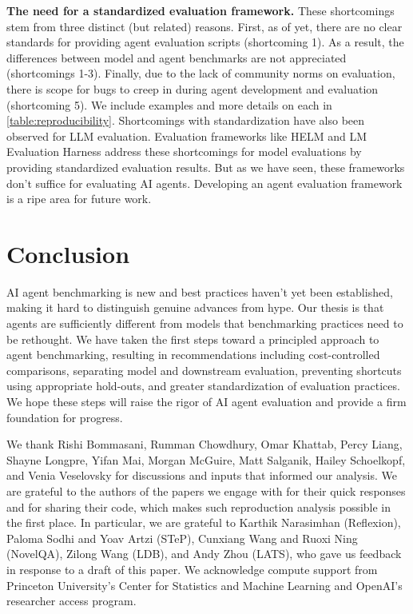 \documentclass{article}
\begin{document}
\textbf{The need for a standardized evaluation framework.} These shortcomings stem from three distinct (but related) reasons. First, as of yet, there are no clear standards for providing agent evaluation scripts (shortcoming 1). As a result, the differences between model and agent benchmarks are not appreciated (shortcomings 1-3). Finally, due to the lack of community norms on evaluation, there is scope for bugs to creep in during agent development and evaluation (shortcoming 5). We include examples and more details on each in \cref{table:reproducibility}.
Shortcomings with standardization have also been observed for LLM evaluation. Evaluation frameworks like HELM \citep{liang_holistic_2023} and LM Evaluation Harness \citep{biderman_lessons_2024} address these shortcomings for model evaluations by providing standardized evaluation results. 
But as we have seen, these frameworks don't suffice for evaluating AI agents. Developing an agent evaluation framework is a ripe area for future work.










\section{Conclusion}

AI agent benchmarking is new and best practices haven't yet been established, making it hard to distinguish genuine advances from hype. %
Our thesis is that agents are sufficiently different from models that benchmarking practices need to be rethought. We have taken the first steps toward a principled approach to agent benchmarking, resulting in recommendations including cost-controlled comparisons, separating model and downstream evaluation, preventing shortcuts using appropriate hold-outs, and greater standardization of evaluation practices. We hope these steps will raise the rigor of AI agent evaluation and provide a firm foundation for progress.


    



\begin{ack}
We thank Rishi Bommasani, Rumman Chowdhury, Omar Khattab, Percy Liang, Shayne Longpre, Yifan Mai, Morgan McGuire, Matt Salganik, Hailey Schoelkopf, and Venia Veselovsky for discussions and inputs that informed our analysis. We are grateful to the authors of the papers we engage with for their quick responses and for sharing their code, which makes such reproduction analysis possible in the first place. In particular, we are grateful to Karthik Narasimhan (Reflexion), Paloma Sodhi and Yoav Artzi (STeP), Cunxiang Wang and Ruoxi Ning (NovelQA), Zilong Wang (LDB), and Andy Zhou (LATS), who gave us feedback in response to a draft of this paper.
We acknowledge compute support from Princeton University's Center for Statistics and Machine Learning and OpenAI's researcher access program.
\end{ack}
\end{document}
